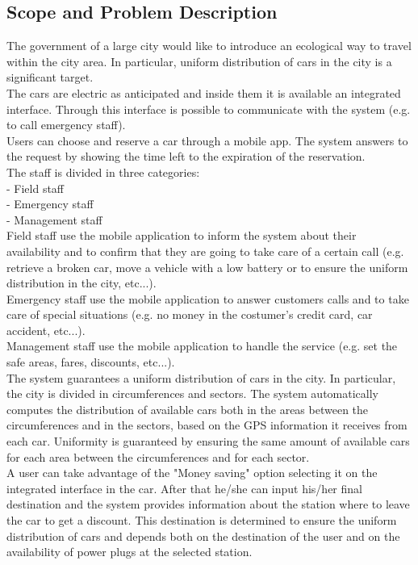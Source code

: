 \documentclass[english]{article}
\begin{document}
 \subsection{Scope and Problem Description}
 
  The government of a large city would like to introduce an ecological way to travel within the city area. In particular,     uniform distribution of cars in the city is a significant target.\\
  \tab \tab The cars are electric as anticipated and inside them it is available an integrated interface. Through this interface   is possible to communicate with the system (e.g. to call emergency staff).\\
  \tab \tab Users can choose and reserve a car through a mobile app. The system answers to the request by showing the    time left to the expiration of the reservation.\\
  The staff is divided in three categories:\\
   - Field staff\\
   - Emergency staff\\
   - Management staff\\
  \tab \tab Field staff use the mobile application to inform the system about their availability and to confirm that they are    going to take care of a certain call (e.g. retrieve a broken car, move a vehicle with a low battery or to ensure the uniform    distribution in the city, etc...).\\
  \tab \tab Emergency staff use the mobile application to answer customers calls and to take care of special situations (e.g.    no money in the costumer's credit card, car accident, etc...).\\
  \tab \tab Management staff use the mobile application to handle the service (e.g. set the safe areas, fares, discounts,     etc...).\\
  \tab \tab The system guarantees a uniform distribution of cars in the city. In particular, the city is divided in       circumferences and sectors. The system automatically computes the distribution of available cars both in the areas     between the circumferences and in the sectors, based on the GPS information it receives from each car. Uniformity is     guaranteed by ensuring the same amount of available cars for each area between the circumferences and for each sector.   \\
  \tab \tab A user can take advantage of the "Money saving" option selecting it on the integrated interface in the car. After    that he/she can input his/her final destination and the system provides information about the station where to leave the    car to get a discount. This destination is determined to ensure the uniform distribution of cars and depends both     on the destination of the user and on the availability of power plugs at the selected station.
	
\end{document}
